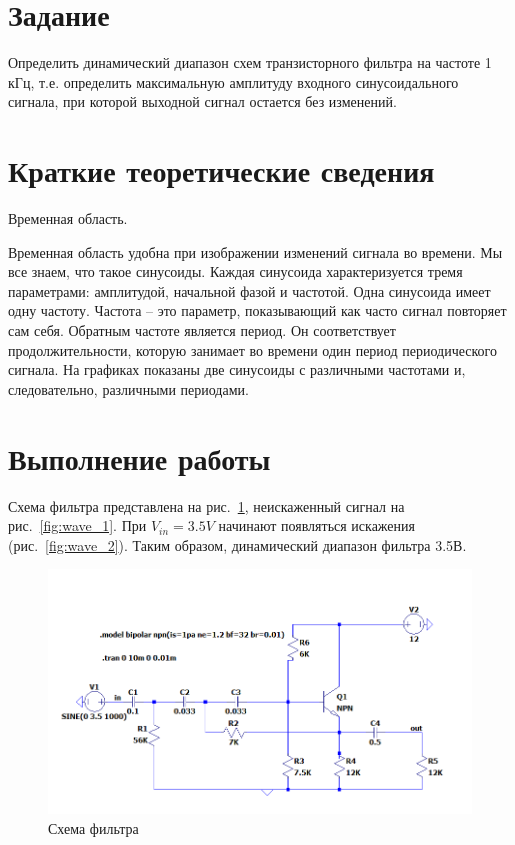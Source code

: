 \documentclass[a4paper,14pt]{article}
\begin{document}

\tableofcontents
\pagebreak

\section{Задание}

Определить динамический диапазон схем транзисторного фильтра на частоте 1 кГц, т.е. определить максимальную амплитуду входного синусоидального сигнала, при которой выходной сигнал остается без изменений.

\section{Краткие теоретические сведения}

Временная область.

Временная область удобна при изображении изменений сигнала во времени. 
Мы все знаем, что такое синусоиды. 
Каждая синусоида характеризуется тремя параметрами: амплитудой, начальной фазой и частотой. 
Одна синусоида имеет одну частоту. 
Частота -- это параметр, показывающий как часто сигнал повторяет сам себя. 
Обратным частоте является период. 
Он соответствует продолжительности, которую занимает во времени один период периодического сигнала. 
На графиках показаны две синусоиды с различными частотами и, следовательно, различными периодами.

\section{Выполнение работы}
	
Схема фильтра представлена на рис.~\ref{fig:schema}, неискаженный сигнал на рис.~\ref{fig:wave_1}.
При $V_{in} = 3.5V$ начинают появляться искажения (рис.~\ref{fig:wave_2}).
Таким образом, динамический диапазон фильтра 3.5В.

\begin{figure}[H]
	\centering
	\includegraphics[width=\linewidth]{image/schema}
	\caption{Схема фильтра}
	\label{fig:schema}
\end{figure}
\end{document}
